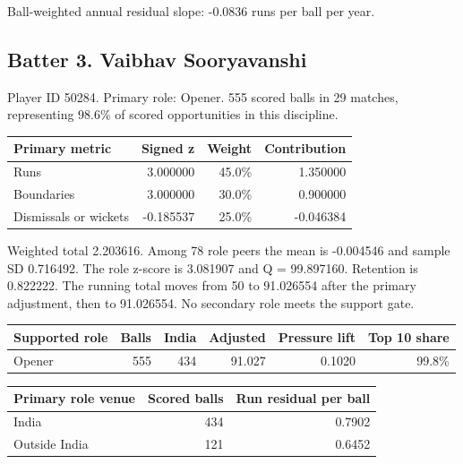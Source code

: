 Ball-weighted annual residual slope: -0.0836 runs per ball per year.

\clearpage

\subsection{Batter 3. Vaibhav Sooryavanshi}

Player ID 50284. Primary role: Opener. 555 scored balls in 29 matches, representing 98.6\% of scored opportunities in this discipline.

\begin{center}
\begin{tabularx}{\linewidth}{>{\raggedright\arraybackslash}Xrrr}
\toprule
Primary metric & Signed z & Weight & Contribution \\
\midrule
Runs & 3.000000 & 45.0\% & 1.350000 \\
Boundaries & 3.000000 & 30.0\% & 0.900000 \\
Dismissals or wickets & -0.185537 & 25.0\% & -0.046384 \\
\bottomrule
\end{tabularx}
\end{center}

Weighted total 2.203616. Among 78 role peers the mean is -0.004546 and sample SD 0.716492. The role z-score is 3.081907 and Q = 99.897160. Retention is 0.822222. The running total moves from 50 to 91.026554 after the primary adjustment, then to 91.026554. No secondary role meets the support gate.

\begin{center}
\begin{tabularx}{\linewidth}{>{\raggedright\arraybackslash}Xrrrrr}
\toprule
Supported role & Balls & India & Adjusted & Pressure lift & Top 10 share \\
\midrule
Opener & 555 & 434 & 91.027 & 0.1020 & 99.8\% \\
\bottomrule
\end{tabularx}
\end{center}

\begin{center}
\begin{tabularx}{\linewidth}{>{\raggedright\arraybackslash}Xrr}
\toprule
Primary role venue & Scored balls & Run residual per ball \\
\midrule
India & 434 & 0.7902 \\
Outside India & 121 & 0.6452 \\
\bottomrule
\end{tabularx}
\end{center}

